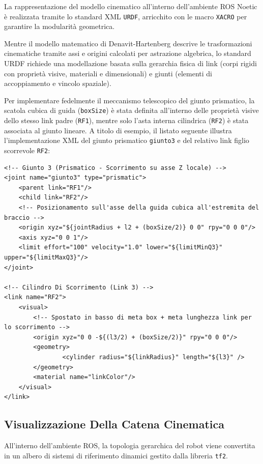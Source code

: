 \documentclass[11pt, a4paper]{report}
\begin{document}
La rappresentazione del modello cinematico all'interno dell'ambiente ROS Noetic è realizzata tramite lo standard XML \texttt{URDF}, arricchito con le macro \texttt{XACRO} per garantire la modularità geometrica.

Mentre il modello matematico di Denavit-Hartenberg descrive le trasformazioni cinematiche tramite assi e origini calcolati per astrazione algebrica, lo standard URDF richiede una modellazione basata sulla gerarchia fisica di link (corpi rigidi con proprietà visive, materiali e dimensionali) e giunti (elementi di accoppiamento e vincolo spaziale).

Per implementare fedelmente il meccanismo telescopico del giunto prismatico, la scatola cubica di guida (\texttt{boxSize}) è stata definita all'interno delle proprietà visive dello stesso link padre (\texttt{RF1}), mentre solo l'asta interna cilindrica (\texttt{RF2}) è stata associata al giunto lineare. A titolo di esempio, il listato seguente illustra l'implementazione XML del giunto prismatico \texttt{giunto3} e del relativo link figlio scorrevole \texttt{RF2}:

\begin{lstlisting}[style=XMLStyle]
<!-- Giunto 3 (Prismatico - Scorrimento su asse Z locale) -->
<joint name="giunto3" type="prismatic">
    <parent link="RF1"/>
    <child link="RF2"/>
    <!-- Posizionamento sull'asse della guida cubica all'estremita del braccio -->
    <origin xyz="${jointRadius + l2 + (boxSize/2)} 0 0" rpy="0 0 0"/>
    <axis xyz="0 0 1"/>
    <limit effort="100" velocity="1.0" lower="${limitMinQ3}" upper="${limitMaxQ3}"/>
</joint>

<!-- Cilindro Di Scorrimento (Link 3) -->
<link name="RF2">
    <visual>
        <!-- Spostato in basso di meta box + meta lunghezza link per lo scorrimento -->
        <origin xyz="0 0 -${(l3/2) + (boxSize/2)}" rpy="0 0 0"/>
        <geometry>
                <cylinder radius="${linkRadius}" length="${l3}" />
        </geometry>
        <material name="linkColor"/>
    </visual>
</link>
\end{lstlisting}
\newpage
\subsection{Visualizzazione Della Catena Cinematica}
\label{subsec:catena_cinematica_world}

All'interno dell'ambiente ROS, la topologia gerarchica del robot viene convertita in un albero di sistemi di riferimento dinamici gestito dalla libreria \texttt{tf2}.
\end{document}
